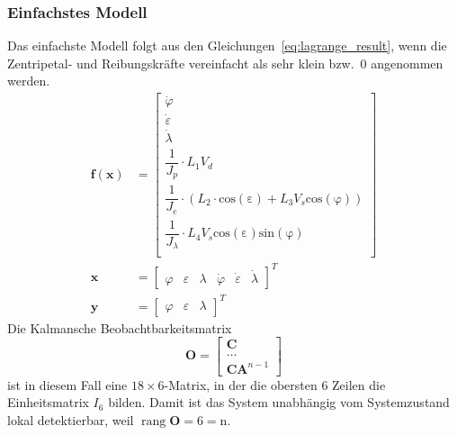 \documentclass[10pt,twocolumn]{article}
\DeclareMathOperator{\rang}{rang}
\begin{document}
	\subsubsection{Einfachstes Modell}
	Das einfachste Modell folgt aus den Gleichungen~\ref{eq:lagrange_result}, wenn die Zentripetal- und Reibungskräfte vereinfacht als sehr klein bzw.\ 0 angenommen werden.
	\begin{align*}
	\bm f(\bm x) &= \begin{bmatrix}
	\dot \varphi \\
	\dot \varepsilon \\
	\dot \lambda  \\
	\dfrac{1}{J_p} \cdot L_1 V_d \\
	\dfrac{1}{J_e} \cdot (L_2 \cdot \mathrm{cos(\varepsilon)} + L_3 V_s \mathrm{cos(\varphi)}) \\
	\dfrac{1}{J_{\lambda}} \cdot L_4 V_s \mathrm{cos(\varepsilon)} \mathrm{sin(\varphi)} \\
	\end{bmatrix}\\
	\bm x &= \begin{bmatrix}
	\varphi & \varepsilon & \lambda & \dot \varphi & \dot \varepsilon & \dot \lambda 
	\end{bmatrix}^T \\
	\bm y &= \begin{bmatrix}
	\varphi & \varepsilon & \lambda 
	\end{bmatrix}^T
\end{align*}
	Die Kalmansche Beobachtbarkeitsmatrix
	$$\bm O = \begin{bmatrix}
	\bm C \\
	\ldots \\
	\bm C \bm A^{n-1}
	\end{bmatrix}$$
	ist in diesem Fall eine $18\times 6$-Matrix, in der die obersten 6 Zeilen die Einheitsmatrix $I_6$ bilden.
	Damit ist das System unabhängig vom Systemzustand lokal detektierbar, weil $\rang \bm O = 6 = \mathrm{n}$.
\end{document}
